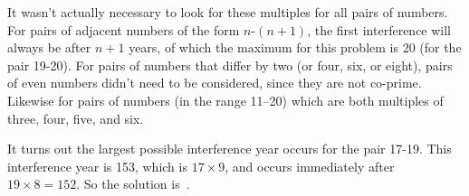\documentclass{article}
\begin{document}
It wasn't actually necessary to look for these multiples for all pairs of numbers.
For pairs of adjacent numbers of the form $n$-$(n+1)$, the first interference will always be after $n+1$ years, of which the maximum for this problem is 20 (for the pair 19-20).
For pairs of numbers that differ by two (or four, six, or eight), pairs of even numbers didn't need to be considered, since they are not co-prime.
Likewise for pairs of numbers (in the range 11--20) which are both multiples of three, four, five, and six.

It turns out the largest possible interference year occurs for the pair 17-19.
This interference year is 153, which is $17\times9$, and occurs immediately after $19\times8=152$.
So the solution is
\,.
\end{document}
